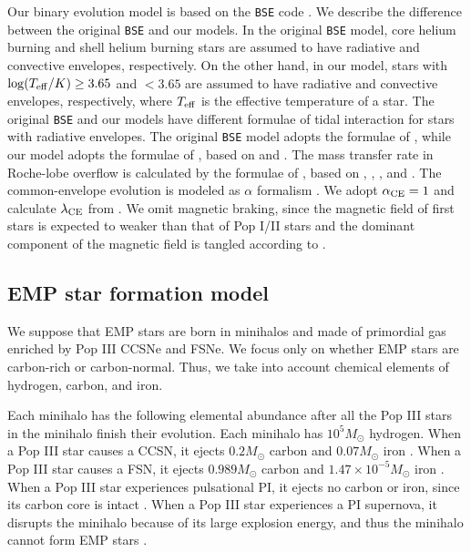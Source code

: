 \documentclass[pdftex]{pasj01}
\newcommand{\msun}{M_\odot}
\newcommand{\teff}{T_{\rm eff}}
\begin{document}
Our binary evolution model is based on the {\tt BSE} code
\citep{2002MNRAS.329..897H}. We describe the difference between the
original {\tt BSE} and our models.  In the original {\tt BSE} model,
core helium burning and shell helium burning stars are assumed to have
radiative and convective envelopes, respectively. On the other hand,
in our model, stars with $\log(\teff/K) \ge 3.65$ and $< 3.65$ are
assumed to have radiative and convective envelopes, respectively,
where $\teff$ is the effective temperature of a star.  The original
{\tt BSE} and our models have different formulae of tidal interaction
for stars with radiative envelopes. The original {\tt BSE} model
adopts the formulae of \citet{1975A&A....41..329Z}, while our model
adopts the formulae of \citet{2021MNRAS.504L..28K}, based on
\citet{2010ApJ...725..940Y} and \citet{2018A&A...616A..28Q}. The mass
transfer rate in Roche-lobe overflow is calculated by the formulae of
\citet{2021MNRAS.504L..28K}, based on \citet{1972AcA....22...73P},
\citet{1978A&A....62..317S}, \citet{1987MNRAS.229..383E}, and
\citet{2017MNRAS.468.5020I}. The common-envelope evolution is modeled
as $\alpha$ formalism \citep{1984ApJ...277..355W}. We adopt
$\alpha_{\rm CE}=1$ and calculate $\lambda_{\rm CE}$ from
\citet{2014A&A...563A..83C}. We omit magnetic braking, since the
magnetic field of first stars is expected to weaker than that of Pop
I/II stars \citep{1989ApJ...342..650P,2011ApJ...741...93D} and the
dominant component of the magnetic field is tangled according to
\citet{2020MNRAS.497..336S}.

\subsection{EMP star formation model}
\label{sec:EMPStarFormationModel}

We suppose that EMP stars are born in minihalos
\citep{2020MNRAS.497.3149C} and made of primordial gas enriched by Pop
III CCSNe and FSNe. We focus only on whether EMP stars are carbon-rich
or carbon-normal. Thus, we take into account chemical elements of
hydrogen, carbon, and iron.

Each minihalo has the following elemental abundance after all the Pop
III stars in the minihalo finish their evolution. Each minihalo has
$10^5 \msun$ hydrogen. When a Pop III star causes a CCSN, it ejects
$0.2 \msun $ carbon and $0.07 \msun$ iron
\citep{2013ARA&A..51..457N}. When a Pop III star causes a FSN, it
ejects $0.989 \msun$ carbon and $1.47 \times 10^{-5} \msun$ iron
\citep{2014ApJ...794..100M}.  When a Pop III star experiences
pulsational PI, it ejects no carbon or iron, since its carbon core is
intact \citep{2020ApJ...905L..21U}. When a Pop III star experiences a
PI supernova, it disrupts the minihalo because of its large explosion
energy, and thus the minihalo cannot form EMP stars
\citep{2007ApJ...670....1G, 2014ApJ...791..116C, 2018MNRAS.475.4378C}.
\end{document}
